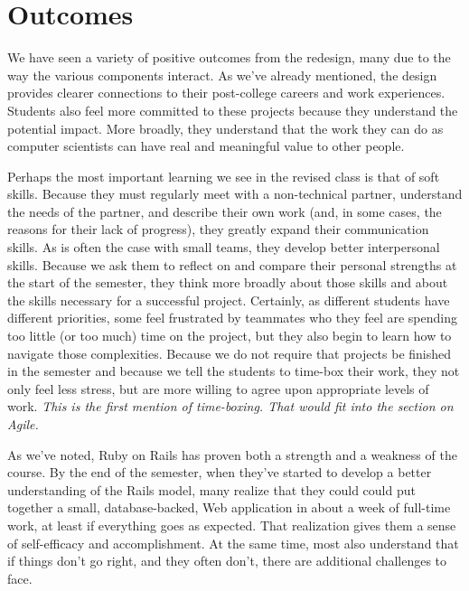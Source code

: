 \section{Outcomes}

We have seen a variety of positive outcomes from the redesign,
many due to the way the various components interact.
As we've already mentioned, the design provides clearer
connections to their post-college careers and work experiences.
Students also feel more committed to these projects
because they understand the potential impact.  More broadly, they
understand that the work they can do as computer scientists can
have real and meaningful value to other people.

Perhaps the most important learning we see in the revised class is
that of soft skills.  Because they must regularly meet with a
non-technical partner, understand the needs of the partner, and
describe their own work (and, in some cases, the reasons for their
lack of progress), they greatly expand their communication skills.
As is often the case with small teams, they develop better interpersonal
skills.  Because we ask them to reflect on and compare their personal
strengths at the start of the semester,
they think more broadly
about those skills and about the skills necessary for a successful
project.  Certainly, as different students have different priorities,
some feel frustrated by teammates who they feel are spending
too little (or too much) time on the project, but they also
begin to learn how to navigate those complexities.  Because we do
not require that projects be finished in the semester and because
we tell the students to time-box their work, they not only feel
less stress, but are more willing to agree upon appropriate levels
of work. 
\textit{This is the first mention of time-boxing. That would fit into the 
section on Agile.}

As we've noted, Ruby on Rails has proven both a strength and a weakness
of the course.  By the end of the semester, when they've started to develop
a better understanding of the Rails model, many realize that they could
could put together a small, database-backed, Web application
in about a week of full-time work, at least if everything goes as
expected.  
That realization gives them a sense of self-efficacy
and accomplishment.  At the same time, most also understand that if things
don't go right, and they often don't, there are additional challenges
to face.

